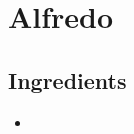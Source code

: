 \thispagestyle{fancy}
\section{Alfredo}
\AddToShipoutPicture*{\Alfredo}

\subsection*{Ingredients}
\begin{multicols}{3}
	\begin{itemize}
		\item 
	\end{itemize}
\end{multicols}